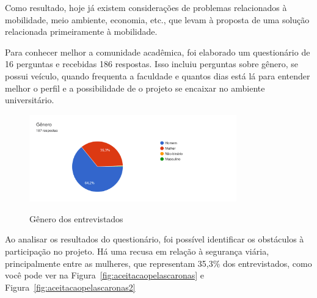 Como resultado, hoje já existem considerações de problemas relacionados à mobilidade, meio ambiente, economia, etc., que levam à proposta de uma solução relacionada primeiramente à mobilidade.


Para conhecer melhor a comunidade acadêmica, foi elaborado um questionário de 16 perguntas e recebidas 186 respostas. Isso incluiu perguntas sobre gênero, se possui veículo, quando frequenta a faculdade e quantos dias está lá para entender melhor o perfil e a possibilidade de o projeto se encaixar no ambiente universitário.

\begin{figure}[!hbtp]
	\centering
	\caption{Gênero dos entrevistados}
	\includegraphics[width=0.8\textwidth]{./04-figuras/questionario/2.png}
	\label{fig:genero}
\end{figure}

Ao analisar os resultados do questionário, foi possível identificar os obstáculos à participação no projeto. Há uma recusa em relação à segurança viária, principalmente entre as mulheres, que representam 35,3\% dos entrevistados, como você pode ver na Figura~\ref{fig:aceitacaopelascaronas} e Figura~\ref{fig:aceitacaopelascaronas2}%

